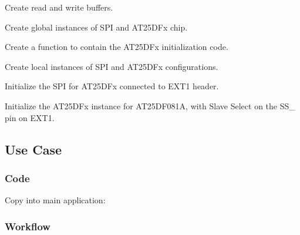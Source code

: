 \begin{DoxyEnumerate}
\item Create read and write buffers. 
\begin{DoxyCodeInclude}{0}
\end{DoxyCodeInclude}

\item Create global instances of S\+PI and A\+T25\+D\+Fx chip. 
\begin{DoxyCodeInclude}{0}
\end{DoxyCodeInclude}

\item Create a function to contain the A\+T25\+D\+Fx initialization code.
\item Create local instances of S\+PI and A\+T25\+D\+Fx configurations. 
\begin{DoxyCodeInclude}{0}
\end{DoxyCodeInclude}

\item Initialize the S\+PI for A\+T25\+D\+Fx connected to E\+X\+T1 header. 
\begin{DoxyCodeInclude}{0}
\end{DoxyCodeInclude}

\item Initialize the A\+T25\+D\+Fx instance for A\+T25\+D\+F081A, with Slave Select on the S\+S\+\_ pin on E\+X\+T1. 
\begin{DoxyCodeInclude}{0}
\end{DoxyCodeInclude}

\end{DoxyEnumerate}\hypertarget{asfdoc_common2_at25dfx_basic_use_asfdoc_common2_at25dfx_basic_use_case}{}\subsection{Use Case}\label{asfdoc_common2_at25dfx_basic_use_asfdoc_common2_at25dfx_basic_use_case}
\hypertarget{asfdoc_common2_at25dfx_basic_use_asfdoc_common2_at25dfx_basic_use_case_code}{}\subsubsection{Code}\label{asfdoc_common2_at25dfx_basic_use_asfdoc_common2_at25dfx_basic_use_case_code}
Copy into main application\+: 
\begin{DoxyCodeInclude}{0}
\end{DoxyCodeInclude}
\hypertarget{asfdoc_common2_at25dfx_basic_use_asfdoc_common2_at25dfx_basic_use_case_flow}{}\subsubsection{Workflow}\label{asfdoc_common2_at25dfx_basic_use_asfdoc_common2_at25dfx_basic_use_case_flow}

